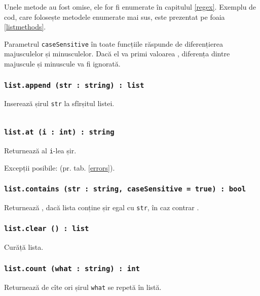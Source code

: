 Unele metode au fost omise, ele for fi enumerate în capitulul \ref{regex}. Exemplu de cod, care folosește metodele enumerate mai sus, este prezentat pe foaia \ref{listmethods}. 

Parametrul \texttt{caseSensitive} în toate funcțiile răspunde de diferențierea majusculelor și minusculelor. Dacă el va primi valoarea \false, diferența dintre majuscule și minuscule va fi ignorată.

\subsubsection{\texttt{list.append (str : string) : list}}

Inserează șirul \texttt{str} la sfîrșitul listei.

\newpage
\begin{sourcecode}
\label{listmethods}
\inputminted[linenos]{icl}{../sources/listmethods.icL}
\end{sourcecode}

\subsubsection{\texttt{list.at (i : int) : string}}

Returnează al \texttt{i}-lea șir.

Excepții posibile:  (pr. tab. \ref{errors}).

\subsubsection{\texttt{list.contains (str : string, caseSensitive = true) : bool}}

Returnează \true, dacă lista conține șir egal cu \texttt{str}, în caz contrar \false.

\subsubsection{\texttt{list.clear () : list}}

Curăță lista.

\subsubsection{\texttt{list.count (what : string) : int}}

Returnează de cîte ori șirul \texttt{what} se repetă în listă.

